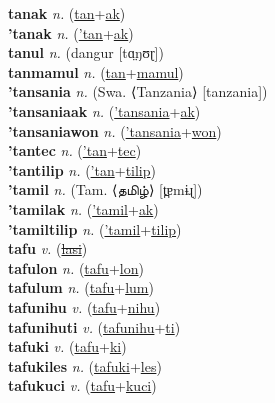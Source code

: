 \textbf{tanak} \textit{n.} (\hyperref[tan]{tan}+\hyperref[ak]{ak})
 \label{tanak} \\
\textbf{'tanak} \textit{n.} (\hyperref['tan]{'tan}+\hyperref[ak]{ak})
 \label{'tanak} \\
\textbf{tanul} \textit{n.} ({\javanese{}dangur} [tɑ̤ŋʊɽ])
 \label{tanul} \\
\textbf{tanmamul} \textit{n.} (\hyperref[tan]{tan}+\hyperref[mamul]{mamul})
 \label{tanmamul} \\
\textbf{'tansania} \textit{n.} (Swa. ⟨Tanzania⟩ [tanzania])
 \label{'tansania} \\
\textbf{'tansaniaak} \textit{n.} (\hyperref['tansania]{'tansania}+\hyperref[ak]{ak})
 \label{'tansaniaak} \\
\textbf{'tansaniawon} \textit{n.} (\hyperref['tansania]{'tansania}+\hyperref[won]{won})
 \label{'tansaniawon} \\
\textbf{'tantec} \textit{n.} (\hyperref['tan]{'tan}+\hyperref[tec]{tec})
 \label{'tantec} \\
\textbf{'tantilip} \textit{n.} (\hyperref['tan]{'tan}+\hyperref[tilip]{tilip})
 \label{'tantilip} \\
\textbf{'tamil} \textit{n.} (Tam. ⟨தமிழ்⟩ [t̪ɐmɨɻ])
 \label{'tamil} \\
\textbf{'tamilak} \textit{n.} (\hyperref['tamil]{'tamil}+\hyperref[ak]{ak})
 \label{'tamilak} \\
\textbf{'tamiltilip} \textit{n.} (\hyperref['tamil]{'tamil}+\hyperref[tilip]{tilip})
 \label{'tamiltilip} \\
\textbf{tafu} \textit{v.} (\hyperref[lasi]{\sout{lasi}})
 \label{tafu} \\
\textbf{tafulon} \textit{n.} (\hyperref[tafu]{tafu}+\hyperref[lon]{lon})
 \label{tafulon} \\
\textbf{tafulum} \textit{n.} (\hyperref[tafu]{tafu}+\hyperref[lum]{lum})
 \label{tafulum} \\
\textbf{tafunihu} \textit{v.} (\hyperref[tafu]{tafu}+\hyperref[nihu]{nihu})
 \label{tafunihu} \\
\textbf{tafunihuti} \textit{v.} (\hyperref[tafunihu]{tafunihu}+\hyperref[ti]{ti})
 \label{tafunihuti} \\
\textbf{tafuki} \textit{v.} (\hyperref[tafu]{tafu}+\hyperref[ki]{ki})
 \label{tafuki} \\
\textbf{tafukiles} \textit{n.} (\hyperref[tafuki]{tafuki}+\hyperref[les]{les})
 \label{tafukiles} \\
\textbf{tafukuci} \textit{v.} (\hyperref[tafu]{tafu}+\hyperref[kuci]{kuci})
